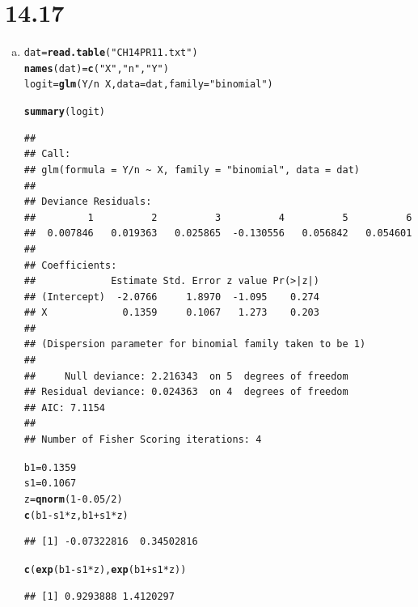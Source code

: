 \documentclass{article}\usepackage[]{graphicx}\usepackage[]{color}
\makeatletter
\newcommand{\hlnum}[1]{\textcolor[rgb]{0.686,0.059,0.569}{#1}}%
\newcommand{\hlstr}[1]{\textcolor[rgb]{0.192,0.494,0.8}{#1}}%
\newcommand{\hlopt}[1]{\textcolor[rgb]{0,0,0}{#1}}%
\newcommand{\hlstd}[1]{\textcolor[rgb]{0.345,0.345,0.345}{#1}}%
\newcommand{\hlkwb}[1]{\textcolor[rgb]{0.69,0.353,0.396}{#1}}%
\newcommand{\hlkwc}[1]{\textcolor[rgb]{0.333,0.667,0.333}{#1}}%
\newcommand{\hlkwd}[1]{\textcolor[rgb]{0.737,0.353,0.396}{\textbf{#1}}}%
\newenvironment{kframe}{%
 \def\at@end@of@kframe{}%
 \ifinner\ifhmode%
  \def\at@end@of@kframe{\end{minipage}}%
  \begin{minipage}{\columnwidth}%
 \fi\fi%
 \def\FrameCommand##1{\hskip\@totalleftmargin \hskip-\fboxsep
 \colorbox{shadecolor}{##1}\hskip-\fboxsep
     \hskip-\linewidth \hskip-\@totalleftmargin \hskip\columnwidth}%
 \MakeFramed {\advance\hsize-\width
   \@totalleftmargin\z@ \linewidth\hsize
   \@setminipage}}%
 {\par\unskip\endMakeFramed%
 \at@end@of@kframe}
\newenvironment{knitrout}{}{} %
\makeatother
\begin{document}
\section{14.17}

\begin{enumerate}[(a)]

\item

\begin{knitrout}
\color{fgcolor}\begin{kframe}
\begin{alltt}
  \hlstd{dat} \hlkwb{=} \hlkwd{read.table}\hlstd{(}\hlstr{"CH14PR11.txt"}\hlstd{)}
  \hlkwd{names}\hlstd{(dat)} \hlkwb{=} \hlkwd{c}\hlstd{(}\hlstr{"X"}\hlstd{,} \hlstr{"n"}\hlstd{,} \hlstr{"Y"}\hlstd{)}
  \hlstd{logit} \hlkwb{=} \hlkwd{glm}\hlstd{(Y}\hlopt{/}\hlstd{n} \hlopt{~} \hlstd{X,} \hlkwc{data} \hlstd{= dat,} \hlkwc{family} \hlstd{=} \hlstr{"binomial"}\hlstd{)}
\end{alltt}


{\ttfamily\noindent\color{warningcolor}{\#\# Warning: non-integer \#successes in a binomial glm!}}\begin{alltt}
  \hlkwd{summary}\hlstd{(logit)}
\end{alltt}
\begin{verbatim}
## 
## Call:
## glm(formula = Y/n ~ X, family = "binomial", data = dat)
## 
## Deviance Residuals: 
##         1          2          3          4          5          6  
##  0.007846   0.019363   0.025865  -0.130556   0.056842   0.054601  
## 
## Coefficients:
##             Estimate Std. Error z value Pr(>|z|)
## (Intercept)  -2.0766     1.8970  -1.095    0.274
## X             0.1359     0.1067   1.273    0.203
## 
## (Dispersion parameter for binomial family taken to be 1)
## 
##     Null deviance: 2.216343  on 5  degrees of freedom
## Residual deviance: 0.024363  on 4  degrees of freedom
## AIC: 7.1154
## 
## Number of Fisher Scoring iterations: 4
\end{verbatim}
\begin{alltt}
  \hlstd{b1} \hlkwb{=} \hlnum{0.1359}
  \hlstd{s1} \hlkwb{=} \hlnum{0.1067}
  \hlstd{z} \hlkwb{=} \hlkwd{qnorm}\hlstd{(}\hlnum{1}\hlopt{-}\hlnum{0.05}\hlopt{/}\hlnum{2}\hlstd{)}
  \hlkwd{c}\hlstd{(b1}\hlopt{-}\hlstd{s1}\hlopt{*}\hlstd{z, b1}\hlopt{+}\hlstd{s1}\hlopt{*}\hlstd{z)}
\end{alltt}
\begin{verbatim}
## [1] -0.07322816  0.34502816
\end{verbatim}
\begin{alltt}
  \hlkwd{c}\hlstd{(}\hlkwd{exp}\hlstd{(b1}\hlopt{-}\hlstd{s1}\hlopt{*}\hlstd{z),} \hlkwd{exp}\hlstd{(b1}\hlopt{+}\hlstd{s1}\hlopt{*}\hlstd{z))}
\end{alltt}
\begin{verbatim}
## [1] 0.9293888 1.4120297
\end{verbatim}
\end{kframe}
\end{knitrout}


\end{enumerate}
\end{document}
